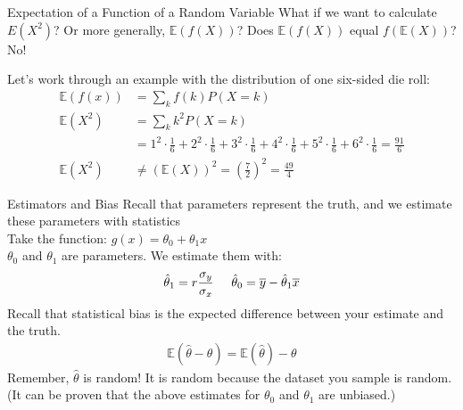 \documentclass[aspectratio=169]{../latex_main/tntbeamer}  %
\begin{document}
	
	\begin{frame}[c]{Expectation of a Function of a Random Variable}
	    What if we want to calculate $E(X^2)$? Or more generally, $\mathbb{E}(f(X))$? Does $\mathbb{E}(f(X))$ equal $f( \mathbb{E}(X) )$? \alert{No!}
	    
	    Let’s work through an example with the distribution of one six-sided die roll:
	    \begin{align*}
	        \mathbb{E}(f(x)) &= \sum\limits_kf(k){P}(X=k)\\
	        \mathbb{E}(X^2) &= \sum\limits_kk^2{P}(X=k)\\
	        &= 1^2\cdot \frac{1}{6} + 2^2\cdot \frac{1}{6} + 3^2\cdot \frac{1}{6} + 4^2\cdot \frac{1}{6} +  5^2\cdot \frac{1}{6} + 6^2\cdot \frac{1}{6} = \frac{91}{6}\\
	        \mathbb{E}(X^2) &\neq (\mathbb{E}(X))^2 = \left(\frac{7}{2}\right)^2 = \frac{49}{4}
	    \end{align*}
	\end{frame}
	
	
	\begin{frame}[c]{Estimators and Bias}
	    Recall that parameters represent the truth, and we estimate these parameters with statistics\\
	    Take the function: $g(x) = \theta_0 + \theta_1x$\\
	   $\theta_0$ and $\theta_1$ are parameters. We estimate them with:
	    \begin{align*}
	       \hat{\theta}_1 = r\frac{\sigma_y}{\sigma_x}\hspace{5mm} \hat{\theta}_0 = \overline{y} - \hat{\theta}_1\overline{x}
	    \end{align*}
	    Recall that statistical bias is the expected difference between your estimate and the truth.
        \begin{align*}
            \mathbb{E}(\hat{\theta} - \theta) = \mathbb{E}(\hat{\theta}) - \theta
        \end{align*}
        Remember, $\hat{\theta}$	is random! It is random because the dataset you sample is random.\\
        (It can be proven that the above estimates for $\theta_0$ and $\theta_1$ are unbiased.)

	\end{frame}
	
\end{document}
